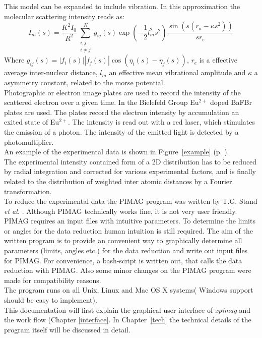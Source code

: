 This model can be expanded to include vibration. In this approximation the molecular scattering intensity reads as: 
\begin{equation*}
I_m(s) = \frac{K^2I_0}{R^2} \sum^N_{ \substack{i,j \\ i\neq j}}g_{ij}(s) \exp \left( -\frac{1}{2} l_m^2s^2 \right) \frac{\sin( s(r_a - \kappa s^2))}{sr_e}
\end{equation*}
 Where $g_{ij}(s) = |f_i(s)||f_j(s)|\cos(\eta_i(s) - \eta_j(s))$, $r_e$ is a effective average inter-nuclear distance, $l_m$ an effective mean vibrational amplitude and $\kappa$ a asymmetry constant, related to the morse potential. \\
 Photographic or electron image plates are used to record the intensity of the scattered electron over a given time. In the Bielefeld Group Eu$^{2+}$ doped BaFBr plates are used. The plates record the electron intensity by accumulation an exited state of Eu$^{2+}$. The intensity is read out with a red laser, which stimulates the emission of a photon. The intensity of the emitted light is detected by a photomultiplier.  \\
An example of the experimental data is shown in Figure~\ref{example} (p. \pageref{example}).\\
The experimental intensity contained form of a 2D distribution has to be reduced by radial integration and corrected for various experimental factors, and is finally related to the distribution of weighted inter atomic distances by a Fourier transformation. \cite{gedbook}\\
To reduce the experimental data the PIMAG program was written by  T.G. Stand \textit{et al.} \cite{pimag}. Although PIMAG technically works fine, it is not very user friendly. PIMAG requires an input files with intuitive parameters.  To determine the limits or angles for the data reduction human intuition is still required. The aim of the written program is to provide an convenient way to graphically determine all parameters (limits, angles etc.) for the data reduction and write out input files for PIMAG. For convenience, a bash-script is written out, that calls the data reduction with PIMAG. Also some minor changes on the PIMAG program were made for compatibility reasons. \\
The program runs on all Unix, Linux and Mac OS X systems( Windows support should be easy to implement). \\
This documentation will first explain the graphical user interface of \textit{xpimag} and the work flow (Chapter \ref{interface}. In Chapter~\ref{tech} the technical details of the program itself will be discussed in detail. 
 
